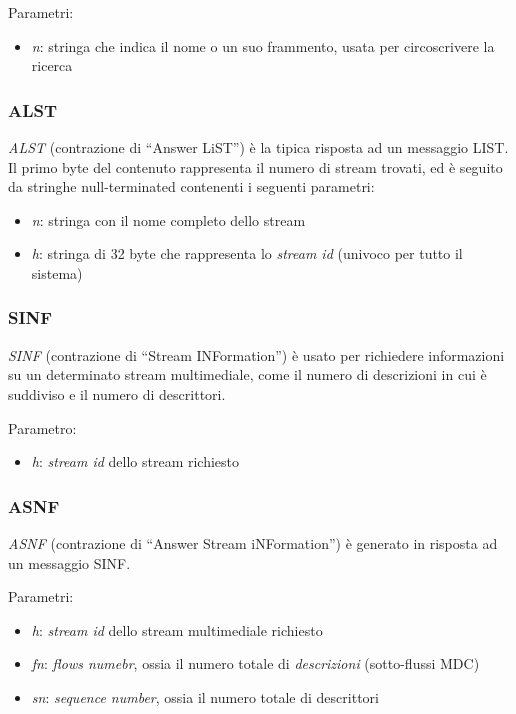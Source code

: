 Parametri:
\begin{itemize}
  \item \emph{n}: stringa che indica il nome o un suo frammento, usata per
  circoscrivere la ricerca
\end{itemize}

\subsubsection*{ALST}
%
\emph{ALST} (contrazione di ``Answer LiST'') è la tipica risposta ad un
messaggio LIST. Il primo byte del contenuto rappresenta il numero di stream
trovati, ed è seguito da stringhe null-terminated contenenti i seguenti
parametri:
\begin{itemize}
  \item \emph{n}: stringa con il nome completo dello stream
  \item \emph{h}: stringa di 32 byte che rappresenta lo \emph{stream id}
  (univoco per tutto il sistema)
\end{itemize}

\subsubsection*{SINF}
\emph{SINF} (contrazione di ``Stream INFormation'') è usato per richiedere
informazioni su un determinato stream multimediale, come il numero di
descrizioni in cui è suddiviso e il numero di descrittori.

Parametro:
\begin{itemize}
  \item \emph{h}: \emph{stream id} dello stream richiesto
\end{itemize}

\subsubsection*{ASNF}
%
\emph{ASNF} (contrazione di ``Answer Stream iNFormation'') è generato in
risposta ad un messaggio SINF.

Parametri:
\begin{itemize}
  \item \emph{h}: \emph{stream id} dello stream multimediale richiesto
  \item \emph{fn}: \emph{flows numebr}, ossia il numero totale di
  \emph{descrizioni} (sotto-flussi MDC)
  \item \emph{sn}: \emph{sequence number}, ossia il numero totale di descrittori
\end{itemize}


